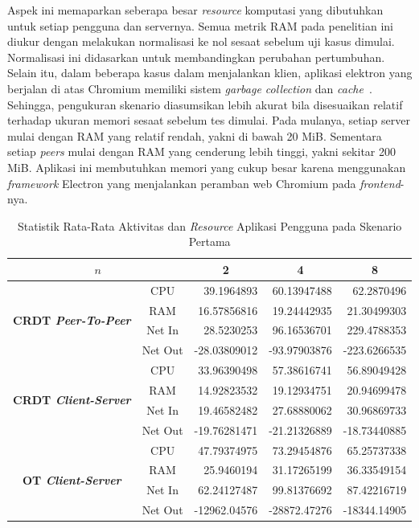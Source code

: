 Aspek ini memaparkan seberapa besar \textit{resource} komputasi yang dibutuhkan untuk setiap pengguna dan servernya. Semua metrik RAM pada penelitian ini diukur dengan melakukan normalisasi ke nol sesaat sebelum uji kasus dimulai. Normalisasi ini didasarkan untuk membandingkan perubahan pertumbuhan. Selain itu, dalam beberapa kasus dalam menjalankan klien, aplikasi elektron yang berjalan di atas Chromium memiliki sistem \textit{garbage collection} dan \textit{cache}~\citep{chromium}. Sehingga, pengukuran skenario diasumsikan lebih akurat bila disesuaikan relatif terhadap ukuran memori sesaat sebelum tes dimulai. Pada mulanya, setiap server mulai dengan RAM yang relatif rendah, yakni di bawah 20 MiB. Sementara setiap \textit{peers} mulai dengan RAM yang cenderung lebih tinggi, yakni sekitar 200 MiB. Aplikasi ini membutuhkan memori yang cukup besar karena menggunakan \textit{framework} Electron yang menjalankan peramban web Chromium pada \textit{frontend}-nya.

\begin{table}[H]
 \centering

 \caption{Statistik Rata-Rata Aktivitas dan \textit{Resource} Aplikasi Pengguna pada Skenario Pertama}
 \label{tab:resource-client-1}
 \begin{tabular}{|cc|r|r|r|}
  \hline
\multicolumn{2}{|c|}{$n$} & \multicolumn{1}{c|}{\textbf{2}} & \multicolumn{1}{c|}{\textbf{4}} & \multicolumn{1}{c|}{\textbf{8}} \\ \hline
\multicolumn{1}{|c|}{\multirow{4}{*}{\textbf{CRDT \textit{Peer-To-Peer}}}} & CPU & 39.1964893 & 60.13947488 & 62.2870496 \\ \cline{2-5}
\multicolumn{1}{|c|}{} & RAM & 16.57856816 & 19.24442935 & 21.30499303 \\ \cline{2-5}
\multicolumn{1}{|c|}{} & Net In & 28.5230253 & 96.16536701 & 229.4788353 \\ \cline{2-5}
\multicolumn{1}{|c|}{} & Net Out & -28.03809012 & -93.97903876 & -223.6266535 \\ \hline
\multicolumn{1}{|c|}{\multirow{4}{*}{\textbf{CRDT \textit{Client-Server}}}} & CPU & 33.96390498 & 57.38616741 & 56.89049428 \\ \cline{2-5}
\multicolumn{1}{|c|}{} & RAM & 14.92823532 & 19.12934751 & 20.94699478 \\ \cline{2-5}
\multicolumn{1}{|c|}{} & Net In & 19.46582482 & 27.68880062 & 30.96869733 \\ \cline{2-5}
\multicolumn{1}{|c|}{} & Net Out & -19.76281471 & -21.21326889 & -18.73440885 \\ \hline
\multicolumn{1}{|c|}{\multirow{4}{*}{\textbf{OT \textit{Client-Server}}}} & CPU & 47.79374975 & 73.29454876 & 65.25737338 \\ \cline{2-5}
\multicolumn{1}{|c|}{} & RAM & 25.9460194 & 31.17265199 & 36.33549154 \\ \cline{2-5}
\multicolumn{1}{|c|}{} & Net In & 62.24127487 & 99.81376692 & 87.42216719 \\ \cline{2-5}
\multicolumn{1}{|c|}{} & Net Out & -12962.04576 & -28872.47276 & -18344.14905 \\ \hline
\end{tabular}
\end{table}

